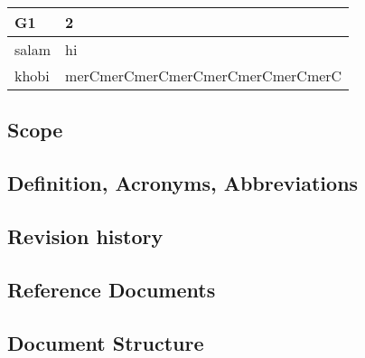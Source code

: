 \begin{table}[hbt!]
\begin{tabular}{ l | l}
\hline
    \textbf{G1} & 2 \\  \hline
    \rowcolor[HTML]{34CDF9} salam & hi \\
    khobi & merCmerCmerCmerCmerCmerCmerCmerC \\ \hline
\end{tabular}
\end{table}

\subsection{Scope}
\subsection{Definition, Acronyms, Abbreviations}
\subsection{Revision history}
\subsection{Reference Documents}
\subsection{Document Structure}
\vfill